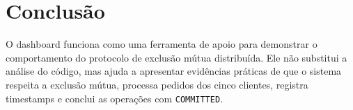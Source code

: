 \documentclass[12pt,a4paper]{article}
\begin{document}
\section{Conclus\~ao}

O dashboard funciona como uma ferramenta de apoio para demonstrar o comportamento do
protocolo de exclus\~ao m\'utua distribu\'ida. Ele n\~ao substitui a an\'alise do c\'odigo, mas
ajuda a apresentar evid\^encias pr\'aticas de que o sistema respeita a exclus\~ao m\'utua,
processa pedidos dos cinco clientes, registra timestamps e conclui as opera\c{c}\~oes com
\texttt{COMMITTED}.
\end{document}
